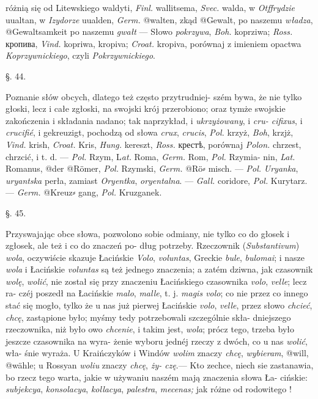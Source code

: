 
różnią się od Litewskiego waldyti, \textit{Finl.} wallitsema, \textit{Svec.}
walda, w \textit{Otffrydzie} uualtan, w \textit{Izydorze} uualden, \textit{Germ.}
@{walten}, zkąd @{Gewalt}, po naszemu \textit{władza}, @{Gewaltsamkeit} po
naszemu \textit{gwałt} — Słowo \textit{pokrzywa}, \textit{Boh.} koprziwa; \textit{Ross.}
кропива, \textit{Vind.} kopriwa, kropiva; \textit{Croat.} kropiva, porównaj
z imieniem opactwa \textit{Koprzywnickiego}, czyli \textit{Pokrzywnickiego}.

§. 44.

Poznanie słów obcych, dlatego też często przytrudniej-
szém bywa, że nie tylko głoski, lecz i całe zgłoski, na
swojski krój przerobiono; oraz tymże swojskie zakończenia
i składania nadano; tak naprzykład, i \textit{ukrzyżowany}, i \textit{cru-
cifixus}, i \textit{crucifié}, i gekreuzigt, pochodzą od słowa \textit{crux},
\textit{crucis}, \textit{Pol.} krzyż, \textit{Boh}, krzjż, \textit{Vind.} krish, \textit{Croat.} Kris,
\textit{Hung.} kereszt, \textit{Ross.} крестѣ, porównaj \textit{Polon.} chrzest, chrzcić,
i t. d. — \textit{Pol.} Rzym, L\textit{at.} Roma, \textit{Germ.} Rom, \textit{Pol.} Rzymia-
nin, \textit{Lat.} Romanus, @{der} @{Römer}, \textit{Pol.} Rzymski, \textit{Germ.} @{Rö⸗
misch}. — \textit{Pol.} \textit{Uryanka}, \textit{uryantska} perła, zamiast \textit{Oryentka},
\textit{oryentalna}. — \textit{Gall.} coridore, \textit{Pol.} Kurytarz. — \textit{Germ.} @{Kreuz⸗
gang}, \textit{Pol.} Kruzganek.

§. 45.

Przyswajając obce słowa, pozwolono sobie odmiany, nie
tylko co do głosek i zgłosek, ale też i co do znaczeń po-
dług potrzeby. Rzeczownik (\textit{Substantivum}) \textit{wola}, oczywiście
skazuje Łacińskie \textit{Volo}, \textit{voluntas}, Greckie \textit{bule}, \textit{bulomai}; i
nasze \textit{wola} i Łacińskie \textit{voluntas} są też jednego znaczenia;
a zatém dziwna, jak czasownik \textit{wolę}, \textit{wolić}, nie został się
przy znaczeniu Łacińskiego czasownika \textit{volo}, \textit{velle}; lecz ra-
czéj poszedł na Łacińskie \textit{malo}, \textit{malle}, t. j. \textit{magis volo}; co
nie przez co innego stać się mogło, tylko że u nas już
pierwej Łacińskie \textit{volo}, \textit{velle}, przez słowo \textit{chcieć}, \textit{chcę},
zastąpione było; myśmy tedy potrzebowali szczególnie skła-
dniejszego rzeczownika, niż było owo \textit{chcenie}, i takim jest,
\textit{wola}; prócz tego, trzeba było jeszcze czasownika na wyra-
żenie wyboru jednéj rzeczy z dwóch, co u nas \textit{wolić}, wła-
śnie wyraża. U Kraińczyków i Windów \textit{wolim} znaczy \textit{chcę},
\textit{wybieram}, @{will}, @{wähle}; u Rossyan \textit{woliu} znaczy \textit{chcę}, \textit{ży-
czę}.— Kto zechce, niech sie zastanawia, bo rzecz tego
warta, jakie w używaniu naszém mają znaczenia słowa Ła-
cińskie: \textit{subjekcya}, \textit{konsolacya}, \textit{kollacya}, \textit{palestra}, \textit{mecenas;}
jak różne od rodowitego !

